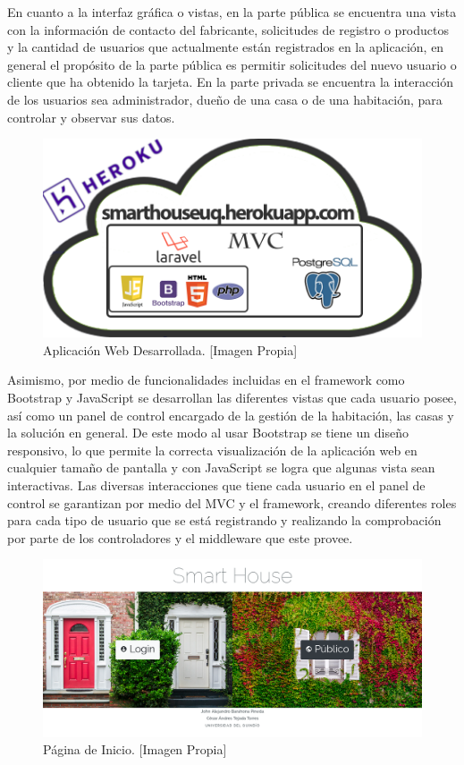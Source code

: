 En cuanto a la interfaz gráfica o vistas, en la parte pública se encuentra una vista con la información de contacto del fabricante, solicitudes de registro o productos y la cantidad de usuarios que actualmente están registrados en la aplicación, en general el propósito de la parte pública es permitir solicitudes del nuevo usuario o cliente que ha obtenido la tarjeta. En la parte privada se encuentra la interacción de los usuarios sea administrador, dueño de una casa o de una habitación, para controlar y observar sus datos.\\

\begin{figure}[!t]
	\centering
	\caption[Aplicación Web Desarrollada.]{Aplicación Web Desarrollada. [Imagen Propia]}
	\label{fig:B_appweb}
	\includegraphics[width=0.5\linewidth]{Imagenes/B_ImplAPPweb}
\end{figure}

Asimismo, por medio de funcionalidades incluidas en el framework como Bootstrap y JavaScript se desarrollan las diferentes vistas que cada usuario posee, así como un panel de control encargado de la gestión de la habitación, las casas y la solución en general. De este modo al usar Bootstrap se tiene un diseño responsivo, lo que permite la correcta visualización de la aplicación web en cualquier tamaño de pantalla y con JavaScript se logra que algunas vista sean interactivas. Las diversas interacciones que tiene cada usuario en el panel de control se garantizan por medio del MVC y el framework, creando diferentes roles para cada tipo de usuario que se está registrando y realizando la comprobación por parte de los controladores y el middleware que este provee.\\

\begin{figure}[!t]
	\centering
	\caption[Página de Inicio.]{Página de Inicio. [Imagen Propia]}
	\label{fig:index}
	\includegraphics[width=0.5\linewidth]{Imagenes/Index}
\end{figure}

